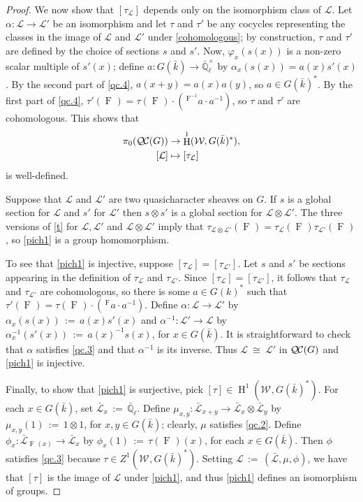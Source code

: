 \documentclass{amsart}
\theoremstyle{plain}
\theoremstyle{definition}
\theoremstyle{remark}
\newcommand{\EE}{\mathbb{\bar Q}_\ell}
\newcommand{\bFq}{\bar{k}}
\newcommand{\Fq}{k}
\newcommand{\EEx}{\EE^\times}
\newcommand{\Weil}[1]{\mathcal{W}_{#1}}
\newcommand{\Frob}[1]{\operatorname{F}_{#1}}
\DeclareMathOperator{\Hh}{H}
\newcommand{\ceq}{{\, :=\, }}
\newcommand{\iso}{{\ \cong\ }}
\newcommand{\qcs}[1]{{\mathcal{#1}}}
\newcommand{\gqcs}[1]{{\mathcal{\bar #1}}}
\newcommand{\QC}{{\mathcal{Q\hskip-0.8pt C}}}
\newcommand{\QCiso}[1]{\pi_0 (\QC(#1))}
\begin{document}
\begin{proof}
  We now show that $[\tau_\qcs{L}]$ depends only on the isomorphism class of $\qcs{L}$.
  Let $\alpha : \qcs{L} \to \qcs{L'}$ be an isomorphism and
  let $\tau$ and $\tau'$ be any cocycles representing the classes in the
  image of $\qcs{L}$ and $\qcs{L'}$ under \eqref{cohomologous}; by construction,
  $\tau$ and $\tau'$ are defined by the choice of sections $s$ and $s'$.
  Now, $\varphi_x(s(x))$ is a
  non-zero scalar multiple of $s'(x)$; define $a: G(\bFq) \to \EEx$
  by $\alpha_x(s(x)) = a(x) s'(x)$.
  By the second part of \ref{qc.4},
  $a(x+y) = a(x)a(y)$, so $a \in G(\bFq)^*$. By the first part of
  \ref{qc.4}, 
  $\tau'(\Frob{}) = \tau(\Frob{}) \cdot (\,^{\Frob{}^{-1}}a \cdot a^{-1})$,
  so $\tau$ and $\tau'$ are cohomologous. This shows that
  \begin{equation}\label{pich1}
  \begin{split}
    \QCiso{G} &\to \Hh^1(\Weil{},G(\bFq)^*),\\
    [\qcs{L}] &\mapsto [\tau_\qcs{L}]
  \end{split}
  \end{equation}
  is well-defined.
  
    Suppose that $\qcs{L}$ and $\qcs{L}'$ are two quasicharacter sheaves on $G$.
  If $s$ is a global section for $\qcs{L}$ and $s'$ for $\qcs{L}'$ then $s \otimes s'$
  is a global section for $\qcs{L} \otimes\qcs{L}'$.  The three versions of \eqref{t}
  for $\qcs{L}, \qcs{L'}$ and $\qcs{L} \otimes\qcs{L}'$ imply that
  $\tau_{\qcs{L} \otimes\qcs{L}'}(\Frob{}) = \tau_\qcs{L}(\Frob{}) \tau_{\qcs{L}'}(\Frob{})$,
  so \eqref{pich1} is a group homomorphism.
 
 
 To see that \eqref{pich1} is injective,
 suppose $[\tau_\qcs{L}] = [\tau_\qcs{L'}]$.
 Let $s$ and $s'$ be sections appearing in the definition of $\tau_\qcs{L}$ and $\tau_\qcs{L'}$.
 Since $[\tau_\qcs{L}] = [\tau_\qcs{L'}]$, 
 it follows that $\tau_\qcs{L}$ and $\tau_{\qcs{L'}}$ are cohomologous, 
 so there is some $a\in G(\Fq)^*$ such that 
 $\tau'(\Frob{}) = \tau(\Frob{}) \cdot (\,^{\Frob{}}a \cdot a^{-1})$. 
 Define $\alpha : \qcs{L}\to \qcs{L'}$ by $\alpha_x(s(x)) \ceq a(x) s'(x)$ and $\alpha^{-1} : \qcs{L}'\to \qcs{L}$
 by $\alpha^{-1}_x(s'(x)) \ceq a(x)^{-1} s(x)$, for $x\in G(\bFq)$.
 It is straightforward to check that $\alpha$ satisfies \ref{qc.3}
 and that $\alpha^{-1}$ is its inverse. Thus $\qcs{L} \iso \qcs{L'}$ in $\QC(G)$ and \eqref{pich1} is injective.
  

 Finally, to show that \eqref{pich1} is surjective, pick $[\tau]\in \Hh^1(\Weil{}, G(\bFq)^*)$.
 For each $x\in G(\bFq)$, set $\gqcs{L}_x \ceq \EE$.
 Define $\mu_{x,y} : \gqcs{L}_{x+y} \to \gqcs{L}_x\otimes \gqcs{L}_y$ by
 $\mu_{x,y}(1) \ceq 1\otimes1$, for $x,y\in G(\bFq)$; 
 clearly, $\mu$ satisfies \ref{qc.2}.
 Define $\phi_x : \gqcs{L}_{\Frob{}(x)} \to \gqcs{L}_x$ by $\phi_x(1) \ceq \tau(\Frob{})(x)$,
 for each $x\in G(\bFq)$. 
 Then $\phi$ satisfies \ref{qc.3} because $\tau \in Z^1(\Weil{},G(\bFq)^*)$.
 Setting $\qcs{L} \ceq (\gqcs{L},\mu,\phi)$, we have that $[\tau]$ is the image of $\qcs{L}$
 under \eqref{pich1}, and thus \eqref{pich1} defines an isomorphism of groups.
\end{proof}
\end{document}
